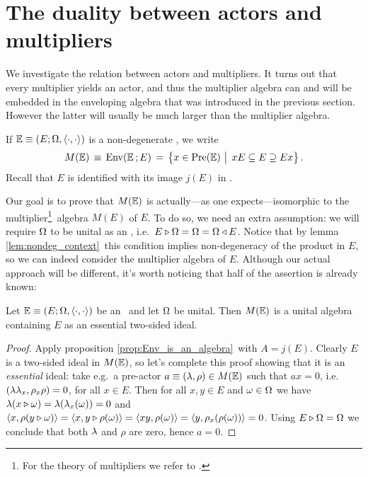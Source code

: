 \section{The duality between actors and multipliers}
\label{sec:multipliers}


\begin{abs_chp}
We investigate the relation between actors and multipliers.
It turns out that every multiplier yields an actor,
and thus the multiplier algebra can and will be embedded in the enveloping algebra
that was introduced in the previous section.
However the latter will usually be much larger than the multiplier algebra.
\end{abs_chp}



\begin{defn_sec} \label{def:MEE}
  If\/ $\mathbb{E} \equiv (E; \Omega, \langle\cdot, \cdot\rangle)$ is a non-degenerate \context, we write
  $$ M(\EE) \, \equiv \,    {\rm Env}(\EE\, ;E)
            \,=\,  \left\{x\in \PreE  \,\left| \vertM \right. \,
                          xE \subseteq E \supseteq Ex  \right\}. $$
  Recall that $E$ is identified with its image $j(E)$ in \PreE.
\end{defn_sec}

Our goal is to prove that $M(\mathbb{E})$ is actually---as one expects---isomorphic to the
multiplier\footnote{For the theory of multipliers we refer to \cite{Fons:MHA}.}\
algebra $M(E)$ of $E$\@. To do so, we need an extra assumption: we will
require $\Omega$ to be unital as an \Ebimod, i.e.\ $E \triangleright \Omega = \Omega = \Omega \triangleleft E$.
Notice that by lemma \ref{lem:nondeg_context}\ this condition implies
non-degeneracy of the product in $E$, so we can indeed consider the multiplier
algebra of $E$. Although our actual approach will be different,
it's worth noticing that half of the assertion is already known:

\begin{remark_sec}
  Let\/ $\mathbb{E} \equiv (E; \Omega, \langle\cdot, \cdot\rangle)$ be an \context\ and let $\Omega$ be unital.
  Then $M(\mathbb{E})$ is a unital algebra containing $E$ as an essential two-sided ideal.
\end{remark_sec}
\begin{proof}
  Apply proposition \ref{prop:Env_is_an_algebra}\ with $A=j(E)$\@.
  Clearly $E$ is a two-sided ideal in $M(\mathbb{E})$,
  so let's complete this proof showing that it is an {\em essential\/} ideal:
  take e.g.\ a pre-actor $a\equiv (\lambda,\rho) \in M(\mathbb{E})$ such that $ax=0$,
  i.e.\ $(\lambda\lambda_x,\rho_x\rho)=0$, for all $x\in E$\@.
  Then for all $x,y \in E$ and $\omega \in \Omega$ we have
  $\lambda(x\triangleright \omega) = \lambda(\lambda_x(\omega)) = 0$ and
  \mbox{$\langle x,\rho(y\triangleright \omega) \rangle = \langle x,y\triangleright \rho(\omega) \rangle
         = \langle xy,\rho(\omega) \rangle = \langle y,\rho_x(\rho(\omega)) \rangle = 0$}\@.
  Using $E\triangleright \Omega = \Omega$ we conclude that both $\lambda$ and $\rho$ are zero,
  hence $a=0$\@.
\end{proof}
\vspace{2ex}


